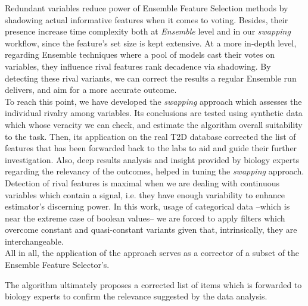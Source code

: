 Redundant variables reduce power of Ensemble Feature Selection methods by shadowing actual informative features when it comes to voting. Besides, their presence increase time complexity both at \emph{Ensemble} level and in our \emph{swapping} workflow, since the feature's set size is kept extensive. At a more in-depth level, regarding Ensemble techniques where a pool of models cast their votes on variables, they influence rival features rank decadence via shadowing. By detecting these rival variants, we can correct the results a regular Ensemble run delivers, and aim for a more accurate outcome.
\\

To reach this point, we have developed the \emph{swapping} approach which assesses the individual rivalry among variables. Its conclusions are tested using synthetic data which whose veracity we can check, and estimate the algorithm overall suitability to the task. Then, its application on the real T2D database corrected the list of features that has been forwarded back to the labs to aid and guide their further investigation. Also, deep results analysis and insight provided by biology experts regarding the relevancy of the outcomes, helped in tuning the \emph{swapping} approach.
\\

Detection of rival features is maximal when we are dealing with continuous variables which contain a signal, i.e. they have enough variability to enhance estimator's discerning power. In this work, usage of categorical data --which is near the extreme case of boolean values-- we are forced to apply filters which overcome constant and quasi-constant variants given that, intrinsically, they are interchangeable.
\\

All in all, the application of the approach serves as a corrector of a subset of the Ensemble Feature Selector's.

The algorithm ultimately proposes a corrected list of items which is forwarded to biology experts to confirm the relevance suggested by the data analysis.